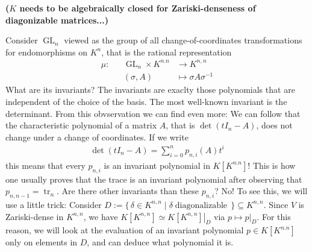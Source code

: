 \begin{example}
  \textbf{($K$ needs to be algebraically closed for Zariski-denseness of diagonizable matrices...)}
  
  Consider $\operatorname{GL}_n$ viewed as the group of all change-of-coordinates transformations for endomorphisms on $K^n$, that is the rational representation
  \begin{equation}
    \begin{aligned}
      \mu \colon && \operatorname{GL}_n \times K^{n.n} & \longrightarrow K^{n,n} \\
      && (\sigma,A) &\longmapsto \sigma A \sigma^{-1}
    \end{aligned}
  \end{equation}
  What are its invariants?
  The invariants are exaclty those polynomials that are independent of the choice of the basis.
  The most well-known invariant is the determinant.
  From this obvservation we can find even more:
  We can follow that the characteristic polynomial of a matrix $A$, that is $\operatorname{det} (tI_n - A)$, does not change under a change of coordinates.
  If we write
  \begin{equation}
    \begin{aligned}
      \operatorname{det} (tI_n - A) = \sum_{i=0}^n p_{n,i} (A) t^i
    \end{aligned}
  \end{equation}
  this means that every $p_{n,i}$ is an invariant polynomial in $K[K^{n.n}]$!
  This is how one usually proves that the trace is an invariant polynomial after observing that $p_{n,n-1} = \operatorname{tr}_n$.
  Are there other invariants than these $p_{n,i}$?
  No!
  To see this, we will use a little trick:
  Consider $D := \{\, \delta \in K^{n,n} \mid \delta \operatorname{diagonalizable} \,\} \subseteq K^{n,n}$.
  Since $V$ is Zariski-dense in $K^{n,n}$, we have $K[K^{n,n}] \simeq \left. K[K^{n,n}] \right|_{D}$ via $p \mapsto \left. p \right|_{D}$.
  For this reason, we will look at the evaluation of an invariant polynomial $p \in K[K^{n.n}] $ only on elements in $D$, and can deduce what polynomial it is.


\end{example}
